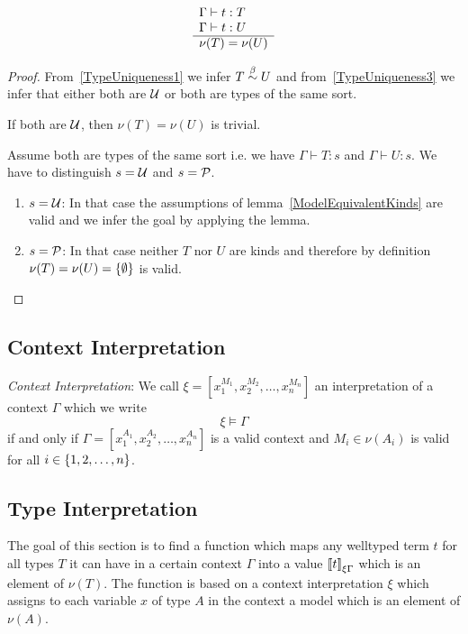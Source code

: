 \begin{theorem}
    $$
    \begin{array}{l} 
        \Gamma \vdash t: T
        \\
        \Gamma \vdash t: U
     \\ \hline 
        \nu(T) = \nu(U)
    \end{array}
    $$

    \begin{proof}
        From~\ref{TypeUniqueness1} we infer $T \stackrel{\beta}{\sim} U$ and
        from~\ref{TypeUniqueness3} we infer that either both are ${\cal U}$ or both
        are types of the same sort.

        If both are ${\cal U}$, then $\nu(T) = \nu(U)$ is trivial.

        Assume both are types of the same sort i.e. we have $\Gamma \vdash T: s$
        and $\Gamma \vdash U: s$. We have to distinguish $s = {\cal U}$ and $s =
        {\cal P}$.

        \begin{enumerate}
        \item $s = {\cal U}$:
            In that case the assumptions of lemma~\ref{ModelEquivalentKinds} are
                valid and we infer the goal by applying the lemma.

        \item $s = {\cal P}$:
            In that case neither $T$ nor $U$ are kinds and therefore by
                definition $\nu(T) = \nu(U) = {\{\emptyset\}}$ is valid.
        \end{enumerate}
    \end{proof}
\end{theorem}




\subsection{Context Interpretation}

\begin{definition}
    \emph{Context Interpretation}:
    We call $\xi = [x_1^{M_1}, x_2^{M_2}, \ldots, x_n^{M_n}]$ an interpretation
    of a context $\Gamma$ which we write
    $$
        \xi \vDash \Gamma
    $$
    if and only if $\Gamma = [x_1^{A_1}, x_2^{A_2}, \ldots, x_n^{A_n}]$ is a
    valid context and $M_i \in \nu(A_i)$ is valid for all $i \in {\{1, 2,
    \ldots, n\}}$.
\end{definition}



\subsection{Type Interpretation}

The goal of this section is to find a function which maps any welltyped term $t$
for all types $T$ it can have in a certain context $\Gamma$ into a value
${{[\![} t{]\!]}}_{\xi\Gamma}$ which is an element of $\nu (T)$. The function is
based on a context interpretation $\xi$ which assigns to each variable $x$ of
type $A$ in the context a model which is an element of $\nu(A)$.

